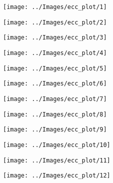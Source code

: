 \begin{figure}[!htbp]

  \begin{minipage}{0.3\textwidth} \centering
    \texttt{[image: ../Images/ecc\_plot/1]}
  \end{minipage}
  \begin{minipage}{0.3\textwidth} \centering
    \texttt{[image: ../Images/ecc\_plot/2]}
  \end{minipage}
  \begin{minipage}{0.3\textwidth} \centering
    \texttt{[image: ../Images/ecc\_plot/3]}
  \end{minipage}
\end{figure}

\begin{figure}[!htbp]

  \begin{minipage}{0.3\textwidth} \centering
    \texttt{[image: ../Images/ecc\_plot/4]}
  \end{minipage}
  \begin{minipage}{0.3\textwidth} \centering
    \texttt{[image: ../Images/ecc\_plot/5]}
  \end{minipage}
  \begin{minipage}{0.3\textwidth} \centering
    \texttt{[image: ../Images/ecc\_plot/6]}
  \end{minipage}
\end{figure}

\begin{figure}[!htbp]

  \begin{minipage}{0.3\textwidth} \centering
    \texttt{[image: ../Images/ecc\_plot/7]}
  \end{minipage}
  \begin{minipage}{0.3\textwidth} \centering
    \texttt{[image: ../Images/ecc\_plot/8]}
  \end{minipage}
  \begin{minipage}{0.3\textwidth} \centering
    \texttt{[image: ../Images/ecc\_plot/9]}
  \end{minipage}
\end{figure}

\begin{figure}[!htbp]

  \begin{minipage}{0.3\textwidth} \centering
    \texttt{[image: ../Images/ecc\_plot/10]}
  \end{minipage}
  \begin{minipage}{0.3\textwidth} \centering
    \texttt{[image: ../Images/ecc\_plot/11]}
  \end{minipage}
  \begin{minipage}{0.3\textwidth} \centering
    \texttt{[image: ../Images/ecc\_plot/12]}
  \end{minipage}
\end{figure}

